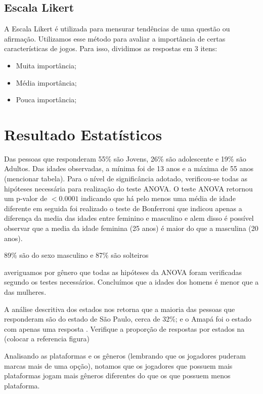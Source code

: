 \documentclass[11pt,a4paper]{article}
\begin{document}
\subsection{Escala Likert}

A Escala Likert é utilizada para mensurar tendências de uma questão ou afirmação. Utilizamos esse método para avaliar a importância de certas características de jogos. Para isso, dividimos as respostas em 3 itens:

\begin{itemize}[noitemsep,nolistsep]
\item Muita importância; 
\item Média importância;
\item Pouca importância;
\end{itemize}

\section{Resultado Estatísticos} 

Das pessoas que responderam 55\% são Jovens, 26\% são adolescente e 19\% são Adultos. Das idades observadas, a mínima foi de 13 anos e a máxima de 55 anos (mencionar tabela). Para o nível de significância  adotado, verificou-se todas as hipóteses necessária para realização do teste ANOVA. O teste ANOVA retornou um p-valor de $<0.0001$ indicando que há pelo menos uma média de idade diferente em seguida foi realizado o teste de Bonferroni que indicou  apenas a diferença da media das idades entre feminino e masculino e alem disso é possível observar que a media da idade feminina (25 anos) é maior do que a masculina (20 anos).



89\% são do sexo masculino e 87\% são solteiros 


averiguamos por gênero que todas as hipóteses da ANOVA foram verificadas segundo os testes necessários. Concluímos que a idades dos homens é menor que a das mulheres. 


A análise descritiva dos estados nos retorna que a maioria das pessoas que responderam são do estado de São Paulo, cerca de 32\%; e o Amapá foi o estado com apenas uma resposta . Verifique a proporção de respostas por estados na (colocar a referencia figura)

Analisando as plataformas e os gêneros (lembrando que os jogadores puderam marcas mais de uma opção), notamos que os jogadores que possuem mais plataformas jogam mais gêneros diferentes do que os que possuem menos plataforma.
\end{document}
